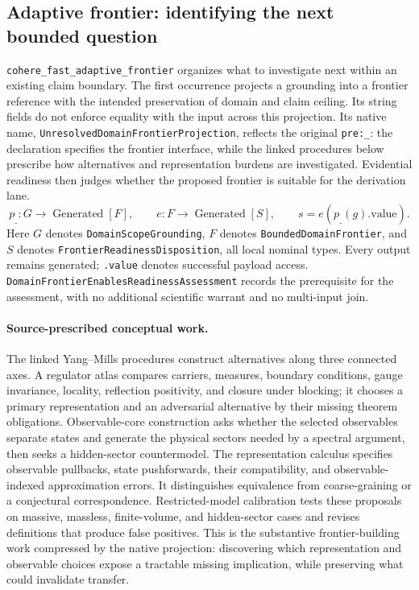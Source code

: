 \subsection{Adaptive frontier: identifying the next bounded question}
\label{app:granular-cohere_fast_adaptive_frontier}
\texttt{cohere\_fast\_adaptive\_frontier} organizes what to investigate next within an existing claim boundary. The first occurrence projects a grounding into a frontier reference with the intended preservation of domain and claim ceiling. Its string fields do not enforce equality with the input across this projection. Its native name, \texttt{Unresolved\allowbreak Domain\allowbreak Frontier\allowbreak Projection}, reflects the original \texttt{pre:\_}: the declaration specifies the frontier interface, while the linked procedures below prescribe how alternatives and representation burdens are investigated. Evidential readiness then judges whether the proposed frontier is suitable for the derivation lane.
\[
 p_{\_}:G\to\operatorname{Generated}[F],\qquad
 e:F\to\operatorname{Generated}[S],\qquad s=e(p_{\_}(g).\mathrm{value}).
\]
Here $G$ denotes \texttt{Domain\allowbreak Scope\allowbreak Grounding}, $F$ denotes \texttt{Bounded\allowbreak Domain\allowbreak Frontier}, and $S$ denotes \texttt{Frontier\allowbreak Readiness\allowbreak Disposition}, all local nominal types. Every output remains generated; \texttt{.value} denotes successful payload access. \texttt{Domain\allowbreak Frontier\allowbreak Enables\allowbreak Readiness\allowbreak Assessment} records the prerequisite for the assessment, with no additional scientific warrant and no multi-input join.

\paragraph{Source-prescribed conceptual work.}
The linked Yang--Mills procedures construct alternatives along three connected axes. A regulator atlas compares carriers, measures, boundary conditions, gauge invariance, locality, reflection positivity, and closure under blocking; it chooses a primary representation and an adversarial alternative by their missing theorem obligations. Observable-core construction asks whether the selected observables separate states and generate the physical sectors needed by a spectral argument, then seeks a hidden-sector countermodel. The representation calculus specifies observable pullbacks, state pushforwards, their compatibility, and observable-indexed approximation errors. It distinguishes equivalence from coarse-graining or a conjectural correspondence. Restricted-model calibration tests these proposals on massive, massless, finite-volume, and hidden-sector cases and revises definitions that produce false positives. This is the substantive frontier-building work compressed by the native projection: discovering which representation and observable choices expose a tractable missing implication, while preserving what could invalidate transfer.

